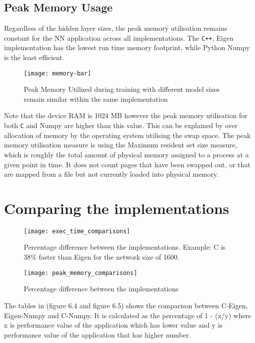 \subsection{Peak Memory Usage}
Regardless of the hidden layer sizes, the peak memory utilisation remains constant for the NN application across all implementations. The \verb!C++!, Eigen implementation has the lowest run time memory footprint, while Python Numpy is the least efficient.

\begin{figure}[!ht]
	\centering
	\texttt{[image: memory-bar]}
	\caption[Peak Memory Utilisation]{Peak Memory Utilized during training with different model sizes remain similar within the same implementation}
\end{figure}


Note that the device RAM is 1024 MB however the peak memory utilisation for both \verb!C! and Numpy are higher than this value. This can be explained by over allocation of memory by the operating system utilising the swap space. The peak memory utilisation measure is using the Maximum resident set size measure, which is roughly the total amount of physical memory assigned to a process at a given point in time. It does not count pages that have been swapped out, or that are mapped from a file but not currently loaded into physical memory.

\section{Comparing the implementations}

\begin{figure}[!ht]
	\centering
	\texttt{[image: exec\_time\_comparisons]}
	\caption[Execution Time vs Model Parameters]{Percentage difference between the implementations. Example: C is 38\% faster than Eigen for the network size of 1600.}
\end{figure}

\begin{figure}[ht]
	\centering
	\texttt{[image: peak\_memory\_comparisons]}
	\caption[Peak Memory Utilisation]{Percentage difference between the implementations}
\end{figure}

The tables in (figure 6.4 and figure 6.5) shows the comparison between C-Eigen, Eigen-Numpy and C-Numpy. It is calculated as the percentage of 1 - (x/y) where x is performance value of the application which has lower value and y is performance value of the application that has higher number.

